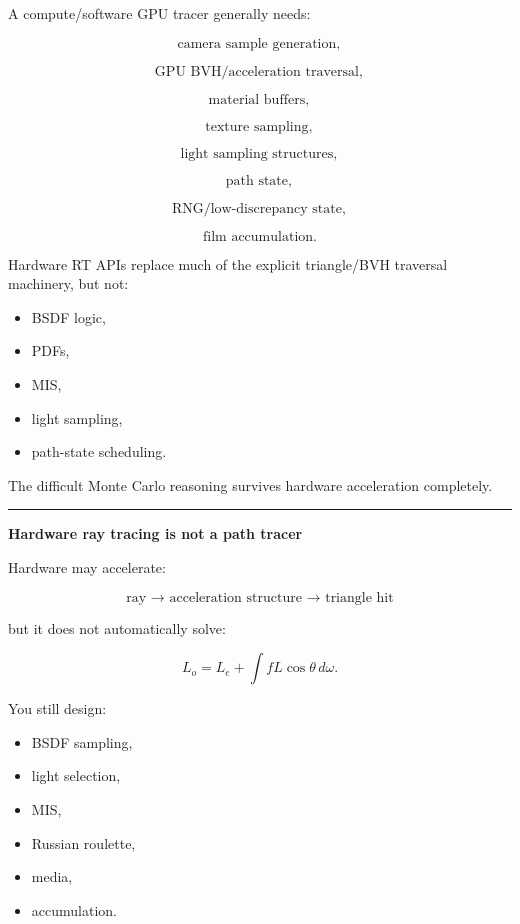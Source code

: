 A compute/software GPU tracer generally needs:

\[
\text{camera sample generation},
\]

\[
\text{GPU BVH/acceleration traversal},
\]

\[
\text{material buffers},
\]

\[
\text{texture sampling},
\]

\[
\text{light sampling structures},
\]

\[
\text{path state},
\]

\[
\text{RNG/low-discrepancy state},
\]

\[
\text{film accumulation}.
\]

Hardware RT APIs replace much of the explicit triangle/BVH traversal machinery, but not:

\begin{itemize}
\tightlist
\item
  BSDF logic,
\item
  PDFs,
\item
  MIS,
\item
  light sampling,
\item
  path-state scheduling.
\end{itemize}

The difficult Monte Carlo reasoning survives hardware acceleration completely.

\begin{center}\rule{0.5\linewidth}{0.5pt}\end{center}

\textbf{Hardware ray tracing is not a path tracer}

Hardware may accelerate:

\[
\boxed{
\text{ray → acceleration structure → triangle hit}
}
\]

but it does not automatically solve:

\[
L_o=
L_e+
\int fL\cos\theta\,d\omega.
\]

You still design:

\begin{itemize}
\tightlist
\item
  BSDF sampling,
\item
  light selection,
\item
  MIS,
\item
  Russian roulette,
\item
  media,
\item
  accumulation.
\end{itemize}

